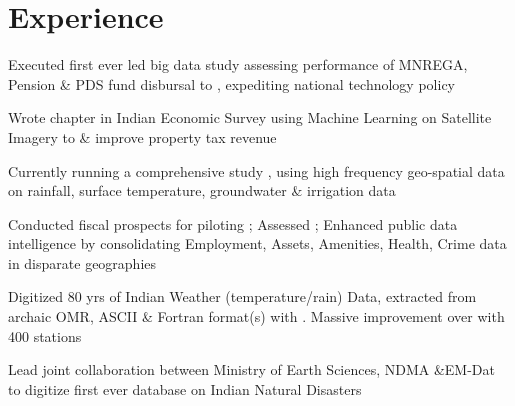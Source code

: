 \documentclass[]{deedy-resume-openfont}
\begin{document}
\hfill
\begin{minipage}[t]{0.66\textwidth}


\section{Experience}

\vspace{\topsep}
\begin{tightemize}
\item Executed first ever  led big data study assessing performance of  MNREGA, Pension \& PDS fund disbursal to , expediting national technology policy
\item Wrote chapter in Indian Economic Survey using Machine Learning on Satellite Imagery to  \& improve property tax revenue
\item Currently running a comprehensive study  , using high frequency geo-spatial data on rainfall, surface temperature, groundwater \& irrigation data
\item Conducted fiscal prospects for piloting ; Assessed ; Enhanced public data intelligence by consolidating Employment, Assets, Amenities, Health, Crime data in disparate geographies
\end{tightemize}

\begin{tightemize}
\item Digitized 80 yrs of Indian Weather (temperature/rain) Data, extracted from archaic OMR, ASCII \& Fortran format(s) with . Massive improvement over  with 400 stations
\item Lead joint collaboration between Ministry of Earth Sciences, NDMA \&EM-Dat to digitize first ever database on Indian Natural Disasters
\end{tightemize}


\end{minipage}
\end{document}
